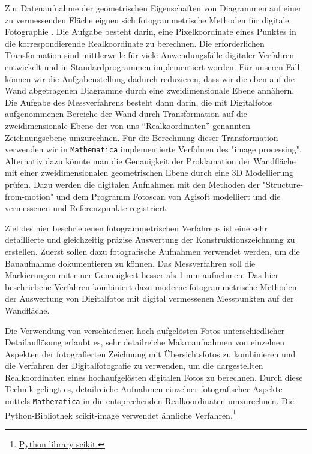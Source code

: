\documentclass[twocolumn]{bmcart}
\begin{document}
Zur Datenaufnahme der geometrischen  Eigenschaften von Diagrammen auf einer zu vermessenden Fläche eignen sich fotogrammetrische Methoden für digitale Fotographie \cite{kraus2004}. Die Aufgabe besteht darin, eine Pixelkoordinate eines Punktes in die korrespondierende Realkoordinate zu berechnen. Die erforderlichen Transformation sind mittlerweile für viele Anwendungsfälle digitaler Verfahren entwickelt und in Standardprogrammen implementiert worden. Für unseren Fall können wir die Aufgabenstellung dadurch reduzieren, dass wir die eben auf die Wand abgetragenen Diagramme durch eine zweidimensionale Ebene annähern. Die Aufgabe des Messverfahrens  besteht dann darin, die mit Digitalfotos aufgenommenen Bereiche der Wand durch Transformation auf die zweidimensionale Ebene der von uns ``Realkoordinaten'' genannten Zeichnungsebene umzurechnen. Für die Berechnung dieser Transformation verwenden wir in \texttt{Mathematica} implementierte Verfahren des "image processing". Alternativ dazu könnte man die Genauigkeit der Proklamation der Wandfläche mit einer zweidimensionalen geometrischen Ebene durch eine 3D Modellierung prüfen. Dazu werden die digitalen Aufnahmen mit den Methoden der "Structure-from-motion" und dem Programm Fotoscan von Agisoft modelliert und die vermessenen und Referenzpunkte registriert. 

Ziel des hier beschriebenen fotogrammetrischen Verfahrens ist eine sehr detaillierte und gleichzeitig präzise Auswertung der Konstruktionszeichnung zu erstellen. Zuerst sollen dazu fotografische Aufnahmen verwendet werden, um die Bauaufnahme dokumentieren zu können. Das Messverfahren soll die Markierungen mit einer Genauigkeit besser als 1 mm aufnehmen. Das hier beschriebene Verfahren kombiniert dazu moderne fotogrammetrische Methoden der Auswertung von Digitalfotos mit digital vermessenen Messpunkten auf der Wandfläche.

Die Verwendung von verschiedenen hoch aufgelösten Fotos unterschiedlicher Detailauflösung erlaubt es, sehr detailreiche Makroaufnahmen von einzelnen Aspekten der fotografierten Zeichnung mit Übersichtsfotos zu kombinieren und die Verfahren der Digitalfotografie zu verwenden, um die dargestellten Realkoordinaten eines hochaufgelösten digitalen Fotos zu berechnen. Durch diese Technik gelingt es, detailreiche Aufnahmen einzelner fotografischer Aspekte mittels \texttt{Mathematica} in die entsprechenden Realkoordinaten umzurechnen. Die Python-Bibliothek scikit-image verwendet ähnliche Verfahren.\footnote{\href{http://scikit-image.org/}{Python library scikit.}}
\end{document}
